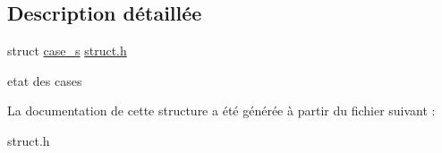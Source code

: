 \subsection{Description détaillée}
struct \hyperlink{structcase__s}{case\+\_\+s} \hyperlink{struct_8h_source}{struct.\+h} 

etat des cases 

La documentation de cette structure a été générée à partir du fichier suivant \+:\begin{DoxyCompactItemize}
\item 
struct.\+h\end{DoxyCompactItemize}
